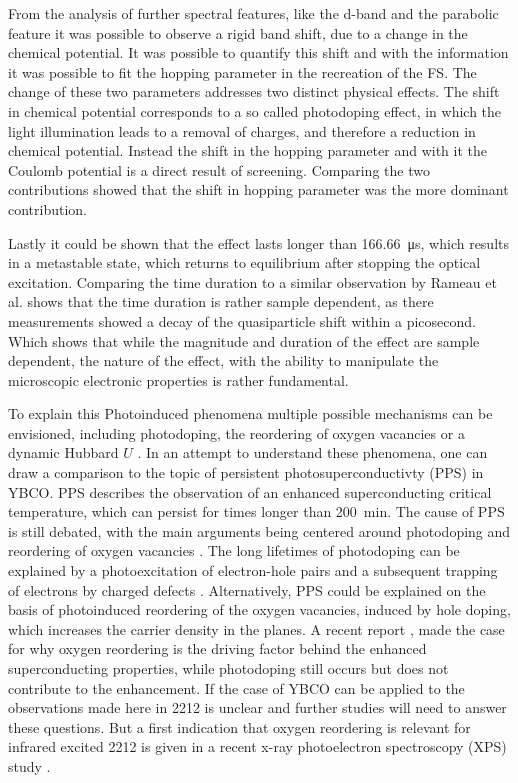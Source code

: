 From the analysis of further spectral features, like the  d-band and the parabolic feature it was possible to observe a rigid band shift, due to a change in the chemical potential.
It was possible to quantify this shift and with the information it was possible to fit the hopping parameter in the recreation of the FS.
The change of these two parameters addresses two distinct physical effects.
The shift in chemical potential corresponds to a so called photodoping effect, in which the light illumination leads to a removal of charges, and therefore a reduction in chemical potential.
Instead the shift in the hopping parameter and with it the Coulomb potential is a direct result of screening.
Comparing the two contributions showed that the shift in hopping parameter was the more dominant contribution.

Lastly it could be shown that the effect lasts longer than \qty{166.66}{\micro\second}, which results in a metastable state, which returns to equilibrium after stopping the optical excitation.
Comparing the time duration to a similar observation by Rameau et al. \cite{rameau_photoinduced_2014} shows that the time duration is rather sample dependent, as there measurements showed a decay of the quasiparticle shift within a picosecond.
Which shows that while the magnitude and duration of the effect are sample dependent, the nature of the effect, with the ability to manipulate the microscopic electronic properties is rather fundamental.

To explain this Photoinduced phenomena multiple possible mechanisms can be envisioned, including photodoping, the reordering of oxygen vacancies or a dynamic Hubbard $U$ \cite{baykusheva_ultrafast_2022}.
In an attempt to understand these phenomena, one can draw a comparison to the topic of persistent photosuperconductivty (PPS) in YBCO.
PPS describes the observation of an enhanced superconducting critical temperature, which can persist for times longer than \qty{200}{\minute}.
The cause of PPS is still debated, with the main arguments being centered around photodoping and reordering of oxygen vacancies \cite{gilabert_photodoping_2000}.
The long lifetimes of photodoping can be explained by a photoexcitation of electron-hole pairs and a subsequent trapping of electrons by charged defects \cite{el_hage_disentangling_2024,kudinov_persistent_1993,kudinov_mechanisms_1994}.
Alternatively, PPS could be explained on the basis of photoinduced reordering of the oxygen vacancies, induced by hole doping, which increases the carrier density in the  planes.
A recent report \cite{el_hage_disentangling_2024}, made the case for why oxygen reordering is the driving factor behind the enhanced superconducting properties, while photodoping still occurs but does not contribute to the enhancement.
If the case of YBCO can be applied to the observations made here in 2212 is unclear and further studies will need to answer these questions.
But a first indication that oxygen reordering is relevant for infrared excited 2212 is given in a recent x-ray photoelectron spectroscopy (XPS) study \cite{puntel_out--equilibrium_2024}.

